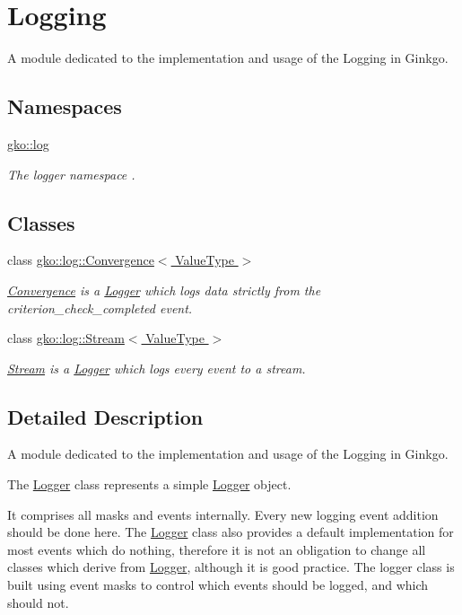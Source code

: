 \hypertarget{group__log}{}\section{Logging}
\label{group__log}


A module dedicated to the implementation and usage of the Logging in Ginkgo.  


\subsection*{Namespaces}
\begin{DoxyCompactItemize}
\item 
 \hyperlink{namespacegko_1_1log}{gko\+::log}
\begin{DoxyCompactList}\small\item\em The logger namespace . \end{DoxyCompactList}\end{DoxyCompactItemize}
\subsection*{Classes}
\begin{DoxyCompactItemize}
\item 
class \hyperlink{classgko_1_1log_1_1Convergence}{gko\+::log\+::\+Convergence$<$ Value\+Type $>$}
\begin{DoxyCompactList}\small\item\em \hyperlink{classgko_1_1log_1_1Convergence}{Convergence} is a \hyperlink{classgko_1_1log_1_1Logger}{Logger} which logs data strictly from the {\ttfamily criterion\+\_\+check\+\_\+completed} event. \end{DoxyCompactList}\item 
class \hyperlink{classgko_1_1log_1_1Stream}{gko\+::log\+::\+Stream$<$ Value\+Type $>$}
\begin{DoxyCompactList}\small\item\em \hyperlink{classgko_1_1log_1_1Stream}{Stream} is a \hyperlink{classgko_1_1log_1_1Logger}{Logger} which logs every event to a stream. \end{DoxyCompactList}\end{DoxyCompactItemize}


\subsection{Detailed Description}
A module dedicated to the implementation and usage of the Logging in Ginkgo. 

The \hyperlink{classgko_1_1log_1_1Logger}{Logger} class represents a simple \hyperlink{classgko_1_1log_1_1Logger}{Logger} object.

It comprises all masks and events internally. Every new logging event addition should be done here. The \hyperlink{classgko_1_1log_1_1Logger}{Logger} class also provides a default implementation for most events which do nothing, therefore it is not an obligation to change all classes which derive from \hyperlink{classgko_1_1log_1_1Logger}{Logger}, although it is good practice. The logger class is built using event masks to control which events should be logged, and which should not. 